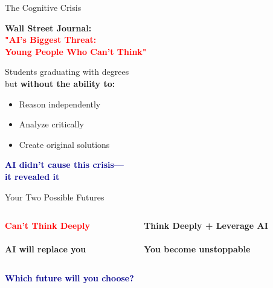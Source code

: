 \documentclass[aspectratio=169,12pt]{beamer}
\begin{document}
\begin{frame}{The Cognitive Crisis}
\begin{center}
\textbf{Wall Street Journal:}\\
\vspace{0.2cm}
\textcolor{red}{\textbf{"AI's Biggest Threat:\\
Young People Who Can't Think"}}

\vspace{0.2cm}
\normalsize
Students graduating with degrees\\
but \textbf{without the ability to:}
\begin{itemize}
\item Reason independently
\item Analyze critically
\item Create original solutions
\end{itemize}

\vspace{0.3cm}
\large
\textcolor{darkblue}{\textbf{AI didn't cause this crisis—\\
it revealed it}}
\end{center}
\end{frame}

\begin{frame}{Your Two Possible Futures}
\vspace{0.5cm}
\begin{columns}
\begin{column}{0.5\textwidth}
\begin{center}
\textcolor{red}{\textbf{Can't Think Deeply}}\\
\vspace{0.2cm}
\faArrowDown\\
\vspace{0.2cm}
\textbf{AI will replace you}
\end{center}
\end{column}
\begin{column}{0.5\textwidth}
\begin{center}
\textcolor{successgreen}{\textbf{Think Deeply + Leverage AI}}\\
\vspace{0.2cm}
\faArrowDown\\
\vspace{0.2cm}
\textbf{You become unstoppable}
\end{center}
\end{column}
\end{columns}

\vspace{0.5cm}
\begin{center}
\Large
\textcolor{darkblue}{\textbf{Which future will you choose?}}
\end{center}
\end{frame}
\end{document}
